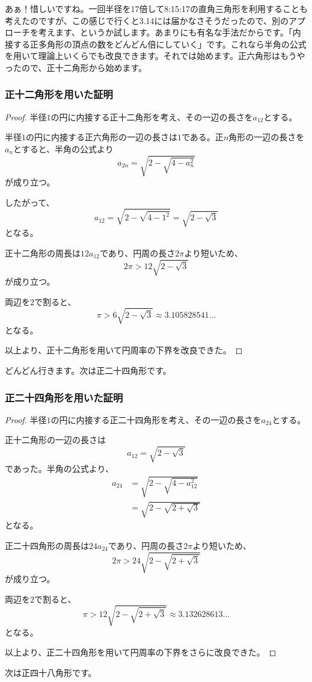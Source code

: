 \documentclass[dvipdfmx]{jlreq}
\begin{document}
あぁ！惜しいですね。一回半径を17倍して8:15:17の直角三角形を利用することも考えたのですが、この感じで行くと3.14には届かなさそうだったので、別のアプローチを考えます、というか試します。あまりにも有名な手法だからです。「内接する正多角形の頂点の数をどんどん倍にしていく」です。これなら半角の公式を用いて理論上いくらでも改良できます。それでは始めます。正六角形はもうやったので、正十二角形から始めます。
\subsubsection{正十二角形を用いた証明}
\begin{proof}
半径$1$の円に内接する正十二角形を考え、その一辺の長さを$a_{12}$とする。

半径$1$の円に内接する正六角形の一辺の長さは$1$である。正$n$角形の一辺の長さを$a_n$とすると、半角の公式より
\[
a_{2n}=\sqrt{2-\sqrt{4-a_n^2}}
\]
が成り立つ。

したがって、
\[
a_{12}=\sqrt{2-\sqrt{4-1^2}}
=\sqrt{2-\sqrt{3}}
\]
となる。

正十二角形の周長は$12a_{12}$であり、円周の長さ$2\pi$より短いため、
\[
2\pi>12\sqrt{2-\sqrt{3}}
\]
が成り立つ。

両辺を$2$で割ると、
\[
\pi>6\sqrt{2-\sqrt{3}}
\approx3.105828541\dots
\]
となる。

以上より、正十二角形を用いて円周率の下界を改良できた。
\end{proof}
どんどん行きます。次は正二十四角形です。
\subsubsection{正二十四角形を用いた証明}
\begin{proof}
半径$1$の円に内接する正二十四角形を考え、その一辺の長さを$a_{24}$とする。

正十二角形の一辺の長さは
\[
a_{12}=\sqrt{2-\sqrt{3}}
\]
であった。半角の公式より、
\[
\begin{aligned}
a_{24}
&=\sqrt{2-\sqrt{4-a_{12}^2}}\\
&=\sqrt{2-\sqrt{2+\sqrt{3}}}
\end{aligned}
\]
となる。

正二十四角形の周長は$24a_{24}$であり、円周の長さ$2\pi$より短いため、
\[
2\pi>24\sqrt{2-\sqrt{2+\sqrt{3}}}
\]
が成り立つ。

両辺を$2$で割ると、
\[
\pi>12\sqrt{2-\sqrt{2+\sqrt{3}}}
\approx3.132628613\dots
\]
となる。

以上より、正二十四角形を用いて円周率の下界をさらに改良できた。
\end{proof}
次は正四十八角形です。
\end{document}
